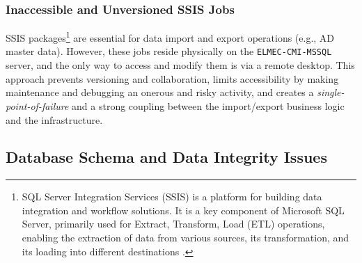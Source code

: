 \subsubsection{Inaccessible and Unversioned SSIS Jobs}
SSIS packages\footnote{SQL Server Integration Services (SSIS) is a platform for building data integration and workflow solutions. It is a key component of Microsoft SQL Server, primarily used for Extract, Transform, Load (ETL) operations, enabling the extraction of data from various sources, its transformation, and its loading into different destinations \cite{ssis}.} are essential for data import and export operations (e.g., AD master data). However, these jobs reside physically on the \texttt{ELMEC-CMI-MSSQL} server, and the only way to access and modify them is via a remote desktop. This approach prevents versioning and collaboration, limits accessibility by making maintenance and debugging an onerous and risky activity, and creates a \textit{single-point-of-failure} and a strong coupling between the import/export business logic and the infrastructure.

\subsection{Database Schema and Data Integrity Issues}



%
%


